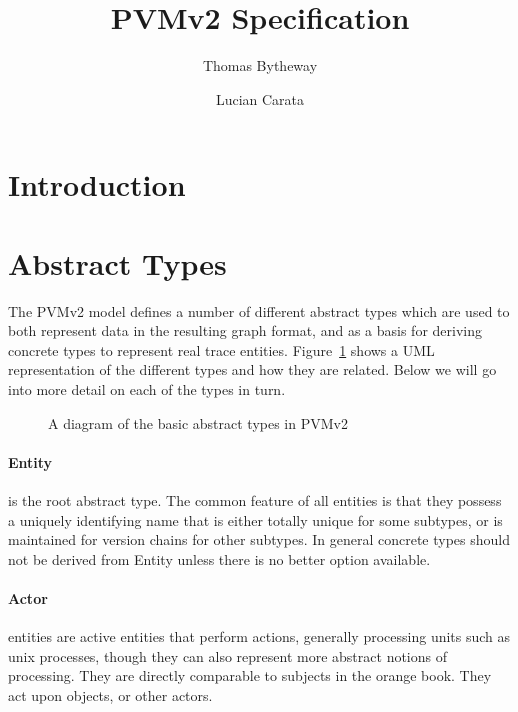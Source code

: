 \documentclass[12pt,twoside,a4paper]{article}
\begin{document}
\title{PVMv2 Specification}
\author{Thomas Bytheway \and Lucian Carata}

\maketitle

\clearpage

\section{Introduction}

\section{Abstract Types}
\label{sec:ty}
The PVMv2 model defines a number of different abstract types which are used to both represent data in the resulting graph format, and as a basis for deriving concrete types to represent real trace entities. Figure~\ref{fig:types} shows a UML representation of the different types and how they are related. Below we will go into more detail on each of the types in turn.

\begin{figure}[h]
\centering
{}
\caption{A diagram of the basic abstract types in PVMv2}
\label{fig:types}
\end{figure}

\paragraph{Entity}
\label{sec:ty:entity}
 is the root abstract type. The common feature of all entities is that they possess a uniquely identifying name that is either totally unique for some subtypes, or is maintained for version chains for other subtypes. In general concrete types should not be derived from Entity unless there is no better option available.

\paragraph{Actor}
\label{sec:ty:actor}
 entities are active entities that perform actions, generally processing units such as unix processes, though they can also represent more abstract notions of processing. They are directly comparable to subjects in the orange book. They act upon objects, or other actors.
\end{document}
